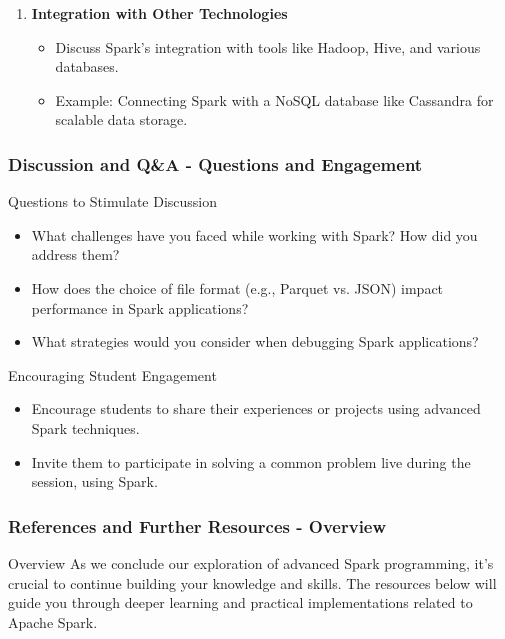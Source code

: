 \documentclass[aspectratio=169]{beamer}
\begin{document}
\begin{frame}[fragile]
\begin{enumerate}
        \item \textbf{Integration with Other Technologies}
        \begin{itemize}
            \item Discuss Spark's integration with tools like Hadoop, Hive, and various databases.
            \item Example: Connecting Spark with a NoSQL database like Cassandra for scalable data storage.
        \end{itemize}
    \end{enumerate}
\end{frame}

\begin{frame}[fragile]
    \frametitle{Discussion and Q\&A - Questions and Engagement}
    \begin{block}{Questions to Stimulate Discussion}
        \begin{itemize}
            \item What challenges have you faced while working with Spark? How did you address them?
            \item How does the choice of file format (e.g., Parquet vs. JSON) impact performance in Spark applications?
            \item What strategies would you consider when debugging Spark applications?
        \end{itemize}
    \end{block}

    \begin{block}{Encouraging Student Engagement}
        \begin{itemize}
            \item Encourage students to share their experiences or projects using advanced Spark techniques.
            \item Invite them to participate in solving a common problem live during the session, using Spark.
        \end{itemize}
    \end{block}
\end{frame}

\begin{frame}[fragile]
    \frametitle{References and Further Resources - Overview}
    \begin{block}{Overview}
        As we conclude our exploration of advanced Spark programming, it’s crucial to continue building your knowledge and skills. 
        The resources below will guide you through deeper learning and practical implementations related to Apache Spark.
    \end{block}
\end{frame}
\end{document}
